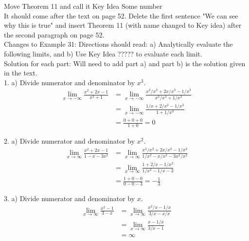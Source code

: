 \documentclass[10pt]{article}
\begin{document}
Move Theorem 11 and call it Key Idea Some number \\

It should come after the text on page 52. Delete the first sentence "We can see why this is true" and insert Theorem 11 (with name changed to Key idea) after the second paragraph on page 52. \\

Changes to Example 31: 
Directions should read: a) Analytically evaluate the following limits, and b) Use Key Idea ????? to evaluate each limit.\\

Solution for each part:  Will need to add part a) and part b) is the solution given in the text. \\

1. a) Divide numerator and denominator by $x^3$. 
\begin{align*}
\lim_{x\to -\infty} \frac{x^2+2x-1}{x^3+1}&= \lim_{x\to -\infty} \frac{x^2/x^3+2x/x^3-1/x^3}{x^3/x^3+1/x^3}\\
&=\lim_{x\to -\infty} \frac{1/x+2/x^2-1/x^3}{1+1/x^3}\\
&=\frac{0+0+0}{1+0}=0
\end{align*}


2. a) Divide numerator and denominator by $x^2$.
\begin{align*}
\lim_{x\to \infty} \frac{x^2+2x-1}{1-x-3x^2}&=\lim_{x\to \infty} \frac{x^2/x^2+2x/x^2-1/x^2}{1/x^2-x/x^2-3x^2/x^2}\\
&=\lim_{x\to \infty} \frac{1+2/x-1/x^2}{1/x^2-1/x-3}\\
&=\frac{1+0-0}{0-0-3}=-\frac{1}{3}
\end{align*}

3. a) Divide numerator and denominator by $x$.
\begin{align*}
\lim_{x\to \infty}\frac{x^2-1}{3-x}&=\lim_{x\to \infty}\frac{x^2/x-1/x}{3/x-x/x}\\
&=\lim_{x\to \infty}\frac{x-1/x}{3/x-1}\\
&=\infty
\end{align*}
\end{document}
